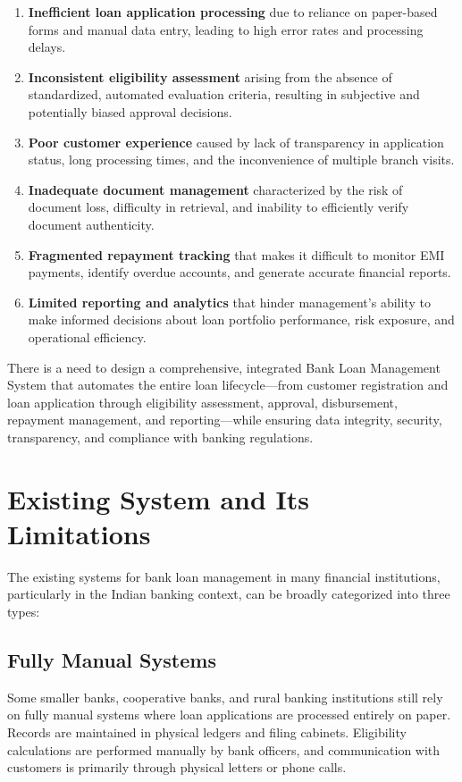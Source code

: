 \documentclass[12pt,a4paper,oneside]{report}
\begin{document}
\begin{enumerate}
  \item \textbf{Inefficient loan application processing} due to reliance on paper-based forms and manual data entry, leading to high error rates and processing delays.
  \item \textbf{Inconsistent eligibility assessment} arising from the absence of standardized, automated evaluation criteria, resulting in subjective and potentially biased approval decisions.
  \item \textbf{Poor customer experience} caused by lack of transparency in application status, long processing times, and the inconvenience of multiple branch visits.
  \item \textbf{Inadequate document management} characterized by the risk of document loss, difficulty in retrieval, and inability to efficiently verify document authenticity.
  \item \textbf{Fragmented repayment tracking} that makes it difficult to monitor EMI payments, identify overdue accounts, and generate accurate financial reports.
  \item \textbf{Limited reporting and analytics} that hinder management's ability to make informed decisions about loan portfolio performance, risk exposure, and operational efficiency.
\end{enumerate}

There is a need to design a comprehensive, integrated Bank Loan Management System that automates the entire loan lifecycle—from customer registration and loan application through eligibility assessment, approval, disbursement, repayment management, and reporting—while ensuring data integrity, security, transparency, and compliance with banking regulations.

\section{Existing System and Its Limitations}

The existing systems for bank loan management in many financial institutions, particularly in the Indian banking context, can be broadly categorized into three types:

\subsection{Fully Manual Systems}

Some smaller banks, cooperative banks, and rural banking institutions still rely on fully manual systems where loan applications are processed entirely on paper. Records are maintained in physical ledgers and filing cabinets. Eligibility calculations are performed manually by bank officers, and communication with customers is primarily through physical letters or phone calls.
\end{document}
